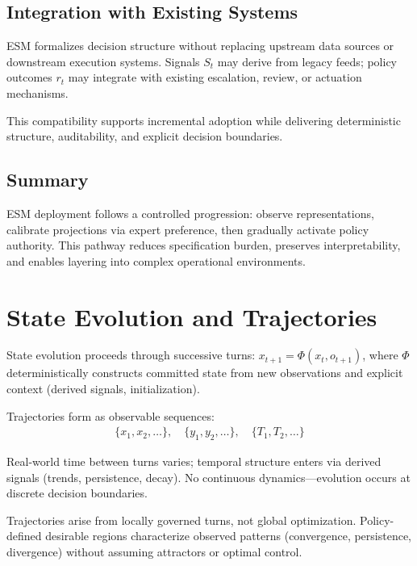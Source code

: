 \documentclass[11pt]{article}
\begin{document}
\subsection{Integration with Existing Systems}

ESM formalizes decision structure without replacing upstream data sources or downstream execution systems. Signals $S_t$ may derive from legacy feeds; policy outcomes $r_t$ may integrate with existing escalation, review, or actuation mechanisms.

This compatibility supports incremental adoption while delivering deterministic structure, auditability, and explicit decision boundaries.

\subsection{Summary}

ESM deployment follows a controlled progression: observe representations, calibrate projections via expert preference, then gradually activate policy authority. This pathway reduces specification burden, preserves interpretability, and enables layering into complex operational environments.

\section{State Evolution and Trajectories}

State evolution proceeds through successive turns: $x_{t+1} = \Phi(x_t, o_{t+1})$, where $\Phi$ deterministically constructs committed state from new observations and explicit context (derived signals, initialization).

Trajectories form as observable sequences:
\begin{align}
\{x_1, x_2, \dots\}, \quad \{y_1, y_2, \dots\}, \quad \{T_1, T_2, \dots\}
\end{align}

Real-world time between turns varies; temporal structure enters via derived signals (trends, persistence, decay). No continuous dynamics---evolution occurs at discrete decision boundaries.

Trajectories arise from locally governed turns, not global optimization. Policy-defined desirable regions characterize observed patterns (convergence, persistence, divergence) without assuming attractors or optimal control.
\end{document}
